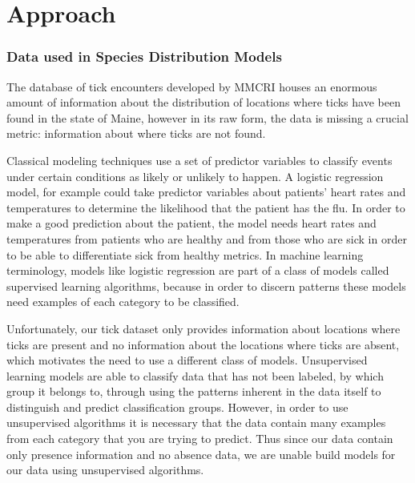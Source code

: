 
\chapter{Approach} %

\label{Chapter2} 



\subsection{Data used in Species Distribution Models}
\noindent The database of tick encounters developed by MMCRI houses an enormous amount of information about the distribution of locations where ticks have been found in the state of Maine, however in its raw form, the data is missing a crucial metric: information about where ticks are not found. \newline

\noindent Classical modeling techniques use a set of predictor variables to classify events under certain conditions as likely or unlikely to happen. A logistic regression model, for example could take predictor variables about patients' heart rates and temperatures to determine the likelihood that the patient has the flu. In order to make a good prediction about the patient, the model needs heart rates and temperatures from patients who are healthy and from those who are sick in order to be able to differentiate sick from healthy metrics. In machine learning terminology, models like logistic regression are part of a class of models called supervised learning algorithms, because in order to discern patterns these models need examples of each category to be classified. \newline

\noindent Unfortunately, our tick dataset only provides information about locations where ticks are present and no information about the locations where ticks are absent, which motivates the need to use a different class of models. Unsupervised learning models are able to classify data that has not been labeled, by which group it belongs to, through using the patterns inherent in the data itself to distinguish and predict classification groups. However, in order to use unsupervised algorithms it is necessary that the data contain many examples from each category that you are trying to predict. Thus since our data contain only presence information and no absence data, we are unable build models for our data using unsupervised algorithms. \newline

